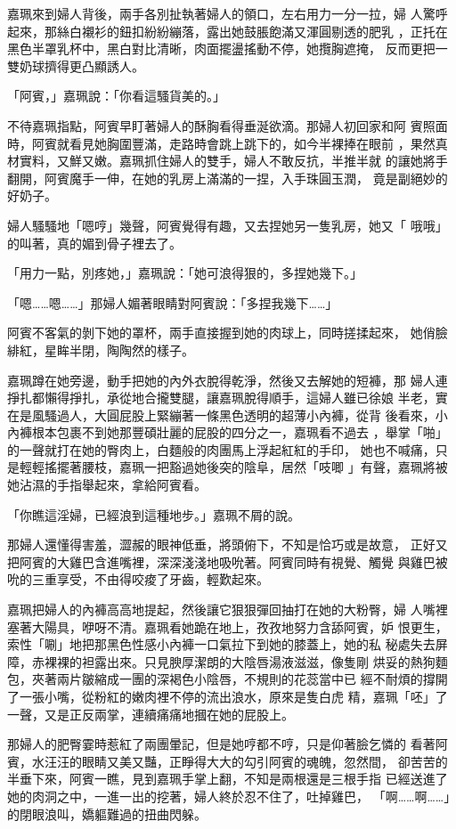 嘉珮來到婦人背後，兩手各別扯執著婦人的領口，左右用力一分一拉，婦
人驚呼起來，那絲白襯衫的鈕扣紛紛繃落，露出她鼓脹飽滿又渾圓剔透的肥乳
，正托在黑色半罩乳杯中，黑白對比清晰，肉面擺盪搖動不停，她攬胸遮掩，
反而更把一雙奶球擠得更凸顯誘人。

「阿賓，」嘉珮說：「你看這騷貨美的。」

不待嘉珮指點，阿賓早盯著婦人的酥胸看得垂涎欲滴。那婦人初回家和阿
賓照面時，阿賓就看見她胸圍豐滿，走路時會跳上跳下的，如今半裸捧在眼前
，果然真材實料，又鮮又嫩。嘉珮抓住婦人的雙手，婦人不敢反抗，半推半就
的讓她將手翻開，阿賓魔手一伸，在她的乳房上滿滿的一捏，入手珠圓玉潤，
竟是副絕妙的好奶子。

婦人騷騷地「嗯哼」幾聲，阿賓覺得有趣，又去捏她另一隻乳房，她又「
哦哦」的叫著，真的媚到骨子裡去了。

「用力一點，別疼她，」嘉珮說：「她可浪得狠的，多捏她幾下。」

「嗯……嗯……」那婦人媚著眼睛對阿賓說：「多捏我幾下……」

阿賓不客氣的剝下她的罩杯，兩手直接握到她的肉球上，同時搓揉起來，
她俏臉緋紅，星眸半閉，陶陶然的樣子。

嘉珮蹲在她旁邊，動手把她的內外衣脫得乾淨，然後又去解她的短褲，那
婦人連掙扎都懶得掙扎，承從地合攏雙腿，讓嘉珮脫得順手，這婦人雖已徐娘
半老，實在是風騷過人，大圓屁股上緊繃著一條黑色透明的超薄小內褲，從背
後看來，小內褲根本包裹不到她那豐碩壯麗的屁股的四分之一，嘉珮看不過去
，舉掌「啪」的一聲就打在她的臀肉上，白麵般的肉團馬上浮起紅紅的手印，
她也不喊痛，只是輕輕搖擺著腰枝，嘉珮一把豁過她後突的陰阜，居然「吱唧
」有聲，嘉珮將被她沾濕的手指舉起來，拿給阿賓看。

「你瞧這淫婦，已經浪到這種地步。」嘉珮不屑的說。

那婦人還懂得害羞，澀赧的眼神低垂，將頭俯下，不知是恰巧或是故意，
正好又把阿賓的大雞巴含進嘴裡，深深淺淺地吸吮著。阿賓同時有視覺、觸覺
與雞巴被吮的三重享受，不由得咬痠了牙齒，輕歎起來。

嘉珮把婦人的內褲高高地提起，然後讓它狠狠彈回抽打在她的大粉臀，婦
人嘴裡塞著大陽具，咿呀不清。嘉珮看她跪在地上，孜孜地努力含舔阿賓，妒
恨更生，索性「唰」地把那黑色性感小內褲一口氣拉下到她的膝蓋上，她的私
秘處失去屏障，赤裸裸的袒露出來。只見腴厚潔朗的大陰唇湯液滋滋，像隻剛
烘妥的熱狗麵包，夾著兩片皺縮成一團的深褐色小陰唇，不規則的花蕊當中已
經不耐煩的撐開了一張小嘴，從粉紅的嫩肉裡不停的流出浪水，原來是隻白虎
精，嘉珮「呸」了一聲，又是正反兩掌，連續痛痛地摑在她的屁股上。

那婦人的肥臀霎時惹紅了兩團暈記，但是她哼都不哼，只是仰著臉乞憐的
看著阿賓，水汪汪的眼睛又美又豔，正睜得大大的勾引阿賓的魂魄，忽然間，
卻苦苦的半垂下來，阿賓一瞧，見到嘉珮手掌上翻，不知是兩根還是三根手指
已經送進了她的肉洞之中，一進一出的挖著，婦人終於忍不住了，吐掉雞巴，
「啊……啊……」的閉眼浪叫，嬌軀難過的扭曲閃躲。

